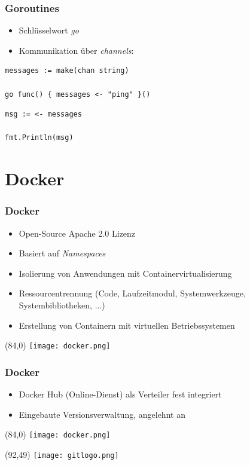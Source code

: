\documentclass{beamer}
\begin{document}
\begin{frame}[fragile]
\frametitle{Goroutines}

\begin{itemize}
\setlength{\itemsep}{24pt}
\item Schl\"usselwort \textit{go}
\item Kommunikation \"uber \textit{channels}:
\end{itemize}

\begin{lstlisting}
messages := make(chan string)

go func() { messages <- "ping" }()
\end{lstlisting}

\begin{lstlisting}
msg := <- messages

fmt.Println(msg)
\end{lstlisting}

\end{frame}


\section{Docker}
\begin{frame}
\frametitle{Docker}

\begin{itemize}
\setlength{\itemsep}{12pt}
\item Open-Source Apache 2.0 Lizenz
\item Basiert auf \textit{Namespaces}
\item Isolierung von Anwendungen mit Containervirtualisierung
\item Ressourcentrennung (Code, Laufzeitmodul, Systemwerkzeuge, Systembibliotheken, ...)
\item Erstellung von Containern mit virtuellen Betriebssystemen
\end{itemize}

\begin{textblock}{20}(84,0)
\texttt{[image: docker.png]}
\end{textblock}

\end{frame}

\begin{frame}
\frametitle{Docker}

\begin{itemize}
\setlength{\itemsep}{20pt}
\item Docker Hub (Online-Dienst) als Verteiler fest integriert
\item Eingebaute Versionsverwaltung, angelehnt an
\end{itemize}

\begin{textblock}{20}(84,0)
\texttt{[image: docker.png]}
\end{textblock}

\begin{textblock}{20}(92,49)
\texttt{[image: gitlogo.png]}
\end{textblock}

\end{frame}
\end{document}
